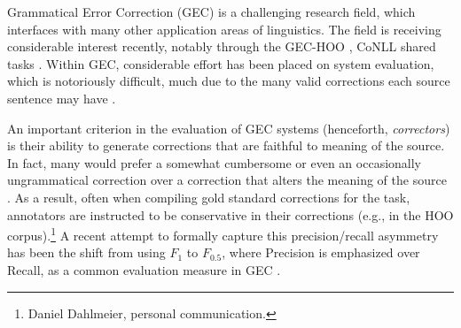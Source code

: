 \documentclass[letter,11pt]{article}
\newcommand{\oa}[1]{\footnote{\color{red}OA: #1}}
\newcommand{\lc}[1]{\footnote{\color{green}LC: #1}}
\begin{document}



Grammatical Error Correction (GEC) is a challenging research field, which interfaces with many
other application areas of linguistics. The field is receiving considerable
interest recently, notably through the GEC-HOO \cite{dale2011helping,dale2012hoo},
CoNLL shared tasks \cite{kao2013conll,ng2014conll}.
Within GEC, considerable effort has been placed on system evaluation,
which is notoriously difficult,
much due to the many valid corrections each source sentence may have
\cite{tetreault2008native,madnani2011they,chodorow2012problems,dahlmeier2012better}.

An important criterion in the evaluation of GEC systems (henceforth, {\it correctors})
is their ability to generate corrections that are faithful to meaning of the source. In fact, many would prefer
a somewhat cumbersome or even an occasionally ungrammatical correction over a correction
that alters the meaning of the source \cite{brockett2006correcting}.
As a result, often when compiling gold standard corrections for the task,
annotators are instructed to be conservative in their corrections (e.g., in the HOO
corpus).\footnote{Daniel Dahlmeier, personal communication.}
A recent attempt to formally capture this precision/recall asymmetry has
been the shift from using $F_1$ to $F_{0.5}$, where Precision is
emphasized over Recall, as a common evaluation measure
in GEC \cite{dahlmeier2012better}.
\end{document}
